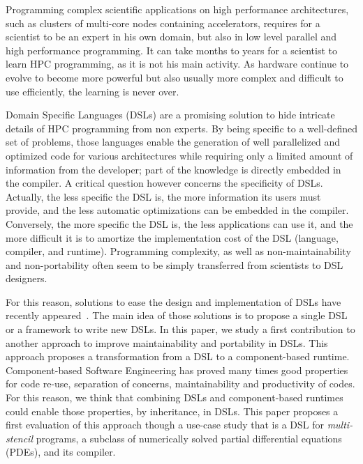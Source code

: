 Programming complex scientific applications on high performance architectures, such as clusters of multi-core nodes containing accelerators, requires for a scientist to be an expert in his own domain, but also in low level parallel and high performance programming. It can take months to years for a scientist to learn HPC programming, as it is not his main activity. As hardware continue to evolve to become more powerful but also usually more complex and difficult to use efficiently, the learning is never over.

Domain Specific Languages (DSLs) are a promising solution to hide intricate details of HPC programming from non experts.
By being specific to a well-defined set of problems, those languages enable the generation of well parallelized and optimized code for various architectures while requiring only a limited amount of information from the developer; part of the knowledge is directly embedded in the compiler.
A critical question however concerns the specificity of DSLs.
Actually, the less specific the DSL is, the more information its users must provide, and the less automatic optimizations can be embedded in the compiler.
Conversely, the more specific the DSL is, the less applications can use it, and the more difficult it is to amortize the implementation cost of the DSL (language, compiler, and runtime).
Programming complexity, as well as non-maintainability and non-portability often seem to be simply transferred from scientists to DSL designers.

For this reason, solutions to ease the design and implementation of DSLs have recently appeared~\cite{Fernandez:2014:DFL:2691166.2691168}. The main idea of those solutions is to propose a single DSL or a framework to write new DSLs. In this paper, we study a first contribution to another approach to improve maintainability and portability in DSLs. This approach proposes a transformation from a DSL to a component-based runtime. Component-based Software Engineering has proved many times good properties for code re-use, separation of concerns, maintainability and productivity of codes. For this reason, we think that combining DSLs and component-based runtimes could enable those properties, by inheritance, in DSLs.
This paper proposes a first evaluation of this approach though a use-case study that is a DSL for \emph{multi-stencil} programs, \ie a subclass of numerically solved partial differential equations (PDEs), and its compiler.

